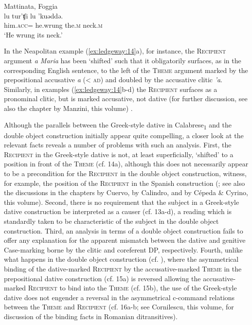 \documentclass[output=paper,modfonts,nonflat]{langsci/langscibook}
\begin{document}
\ex Mattinata, Foggia\\
    \gll lu  tur'ʧi  lu  {}'kuǝddǝ.\\
    him.\textsc{acc}=  he.wrung  the.\textsc{m}  neck.\textsc{m}\\
    \glt `He wrung its neck.'
    \z
    \z

In the Neapolitan example (\ref{ex:ledgeway:14}a), for instance, the \textsc{Recipient} argument \textit{a Maria} has been `shifted' such that it obligatorily surfaces, as in the corresponding English sentence, to the left of the \textsc{Theme} argument marked by the prepositional accusative \textit{a} ({\textless} \textsc{ad}) and doubled by the accusative clitic \textit{’a}. Similarly, in examples (\ref{ex:ledgeway:14}b-d) the \textsc{Recipient} surfaces as a pronominal clitic, but is marked accusative, not dative (for further discussion, see also the chapter by Manzini, this volume) .

Although the parallels between the Greek-style dative in Calabrese\textsubscript{1} and the double object construction initially appear quite compelling, a closer look at the relevant facts reveals a number of problems with such an analysis. First, the \textsc{Recipient} in the Greek-style dative is not, at least superficially, `shifted' to a position in front of the \textsc{Theme} (cf. 14a), although this does not necessarily appear to be a precondition for the \textsc{Recipient} in the double object construction, witness, for example, the position of the \textsc{Recipient} in the Spanish construction (\citealt{Demonte1995}; see also the discussions in the chapters by Cuervo, by Calindro, and by Cépeda \& Cyrino, this volume). Second, there is no requirement that the subject in a Greek-style dative construction be interpreted as a causer (cf. 13a-d), a reading which is standardly taken to be characteristic of the subject in the double object construction. Third, an analysis in terms of a double object construction fails to offer any explanation for the apparent mismatch between the dative and genitive Case-marking borne by the clitic and coreferent DP, respectively. Fourth, unlike what happens in the double object construction (cf. \citealt{Barss1986,Larson1988}), where the asymmetrical binding of the dative-marked \textsc{Recipient} by the accusative-marked \textsc{Theme} in the prepositional dative construction (cf. 15a) is reversed allowing the accusative-marked \textsc{Recipient} to bind into the \textsc{Theme} (cf. 15b), the use of the Greek-style dative does not engender a reversal in the asymmetrical c-command relations between the \textsc{Theme} and \textsc{Recipient} (cf. 16a-b; see Cornilescu, this volume, for discussion of the binding facts in Romanian ditransitives).
\end{document}
